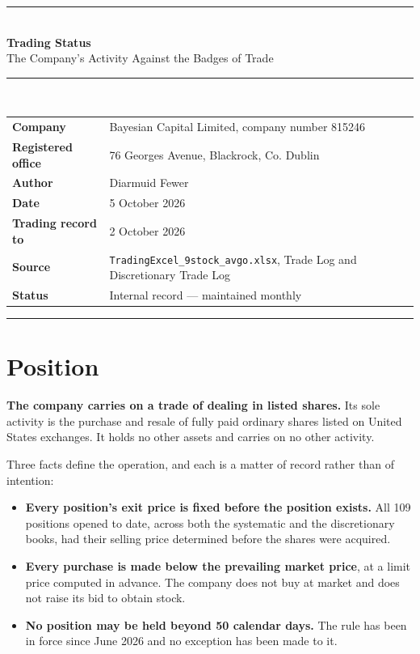 \documentclass[11pt]{article}
\begin{document}
{\color{bcgold}\rule{\textwidth}{1.6pt}}\\[0.3cm]
{\color{bcnavy}\huge\bfseries Trading Status}\\[0.15cm]
{\color{bcblue}\Large The Company's Activity Against the Badges of Trade}\\[0.35cm]
{\color{bcgold}\rule{\textwidth}{0.8pt}}\\[0.35cm]

\begin{tabular}{@{}ll@{}}
\textbf{Company} & Bayesian Capital Limited, company number 815246 \\
\textbf{Registered office} & 76 Georges Avenue, Blackrock, Co. Dublin \\
\textbf{Author} & Diarmuid Fewer \\
\textbf{Date} & 5 October 2026 \\
\textbf{Trading record to} & 2 October 2026 \\
\textbf{Source} & \texttt{TradingExcel\_9stock\_avgo.xlsx}, Trade Log and Discretionary Trade Log \\
\textbf{Status} & Internal record --- maintained monthly \\
\end{tabular}

\vspace{0.6em}
{\color{bcrule}\rule{\textwidth}{0.6pt}}

\section{Position}

\textbf{The company carries on a trade of dealing in listed shares.} Its sole activity is the
purchase and resale of fully paid ordinary shares listed on United States exchanges. It holds no
other assets and carries on no other activity.

Three facts define the operation, and each is a matter of record rather than of intention:

\begin{itemize}[leftmargin=1.4em,itemsep=0.2em]
\item \textbf{Every position's exit price is fixed before the position exists.} All 109 positions
      opened to date, across both the systematic and the discretionary books, had their selling
      price determined before the shares were acquired.
\item \textbf{Every purchase is made below the prevailing market price}, at a limit price computed
      in advance. The company does not buy at market and does not raise its bid to obtain stock.
\item \textbf{No position may be held beyond 50 calendar days.} The rule has been in force since
      June 2026 and no exception has been made to it.
\end{itemize}
\end{document}
